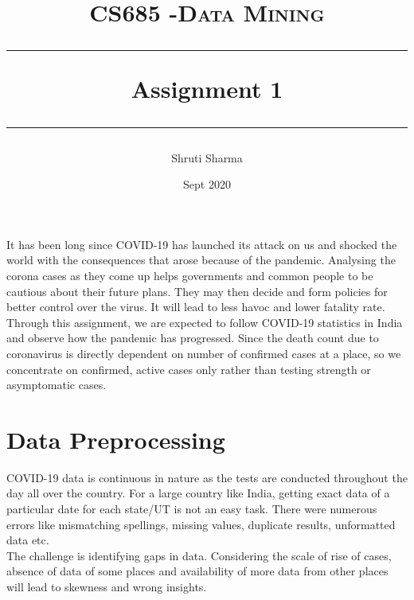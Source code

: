 \documentclass[11pt]{article}
\title{	
	\normalfont\normalsize
	\textsc{CS685 -Data Mining}\linebreak
	\medskip 
	\rule{\linewidth}{0.5pt}\linebreak
	\medskip
	{\huge Assignment 1}
	\medskip 
	\rule{\linewidth}{2pt}
}
\author{Shruti Sharma}
\date{Sept 2020}
\begin{document}
\maketitle
It has been long since COVID-19 has launched its attack on us and shocked the world with the consequences that arose because of the pandemic. Analysing the corona cases as they come up helps governments and common people to be cautious about their future plans. They may then decide and form policies for better control over the virus. It will lead to less havoc and lower fatality rate.
\\
Through this assignment, we are expected to follow COVID-19 statistics in India and observe how the pandemic has progressed. Since the death count due to coronavirus is directly dependent on number of confirmed cases at a place, so we concentrate on confirmed, active cases only rather than testing strength or asymptomatic cases.

\section{Data Preprocessing}
COVID-19 data is continuous in nature as the tests are conducted throughout the day all over the country. For a large country like India, getting exact data of a particular date for each state/UT is not an easy task. There were numerous errors like mismatching spellings, missing values, duplicate results, unformatted data etc. \\

The challenge is identifying gaps in data. Considering the scale of rise of cases, absence of data of some places and availability of more data from other places will lead to skewness and wrong insights.
\end{document}
